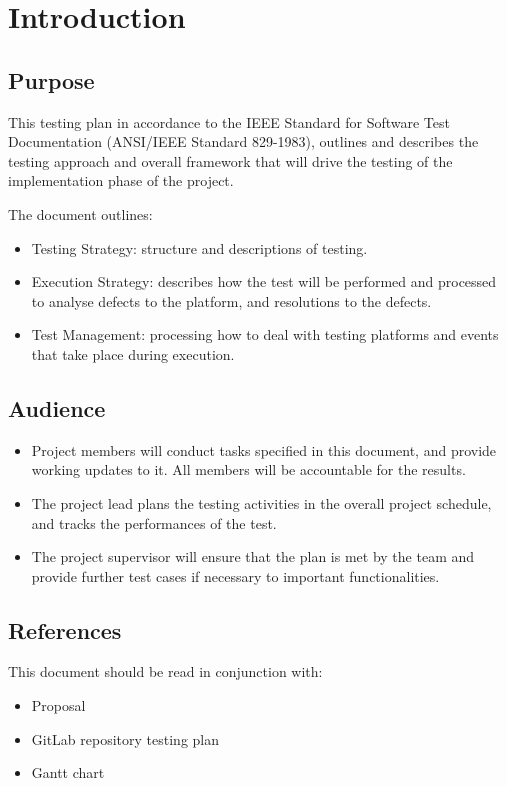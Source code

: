 \section*{Introduction}
\subsection*{Purpose}
This testing plan in accordance to the IEEE Standard for Software Test Documentation (ANSI/IEEE Standard 829-1983), outlines and describes the testing approach and overall framework that will drive the testing of the implementation phase of the project.

The document outlines:
\begin{itemize}
    \item Testing Strategy: structure and descriptions of testing.
    \item Execution Strategy: describes how the test will be performed and processed to analyse defects to the platform, and resolutions to the defects.
    \item Test Management: processing how to deal with testing platforms and events that take place during execution.
\end{itemize}

\subsection*{Audience}
\begin{itemize}
    \item Project members will conduct tasks specified in this document, and provide working updates to it. All members will be accountable for the results.
    \item The project lead plans the testing activities in the overall project schedule, and tracks the performances of the test.
    \item The project supervisor will ensure that the plan is met by the team and provide further test cases if necessary to important functionalities.
\end{itemize}

\subsection*{References}
This document should be read in conjunction with:
\begin{itemize}
    \item Proposal
    \item GitLab repository testing plan
    \item Gantt chart
\end{itemize}


